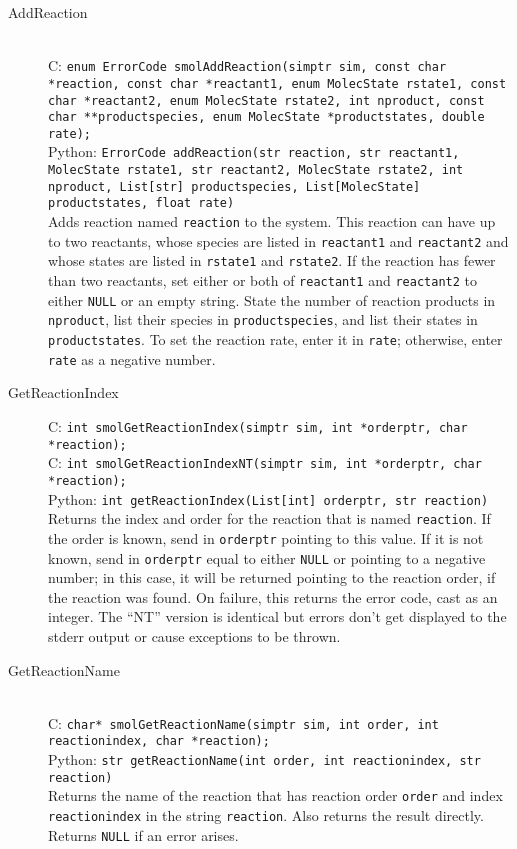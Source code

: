 \documentclass {book}
\begin{document}
\begin{description}

\item[AddReaction]
\hfill \\
C: \texttt{enum ErrorCode smolAddReaction(simptr sim, const char *reaction, const char *reactant1, enum MolecState rstate1, const char *reactant2, enum MolecState rstate2, int nproduct, const char **productspecies, enum MolecState *productstates, double rate);}\\
Python: \texttt{ErrorCode addReaction(str reaction, str reactant1, MolecState rstate1, str reactant2, MolecState rstate2, int nproduct, List[str] productspecies, List[MolecState] productstates, float rate)}\\
Adds reaction named \texttt{reaction} to the system. This reaction can have up to two reactants, whose species are listed in \texttt{reactant1} and \texttt{reactant2} and whose states are listed in \texttt{rstate1} and \texttt{rstate2}. If the reaction has fewer than two reactants, set either or both of \texttt{reactant1} and \texttt{reactant2} to either \texttt{NULL} or an empty string. State the number of reaction products in \texttt{nproduct}, list their species in \texttt{productspecies}, and list their states in \texttt{productstates}. To set the reaction rate, enter it in \texttt{rate}; otherwise, enter \texttt{rate} as a negative number.

\item[GetReactionIndex]
C: \texttt{int smolGetReactionIndex(simptr sim, int *orderptr, char *reaction);}\\
C: \texttt{int smolGetReactionIndexNT(simptr sim, int *orderptr, char *reaction);}\\
Python: \texttt{int getReactionIndex(List[int] orderptr, str reaction)}\\
Returns the index and order for the reaction that is named \texttt{reaction}. If the order is known, send in \texttt{orderptr} pointing to this value. If it is not known, send in \texttt{orderptr} equal to either \texttt{NULL} or pointing to a negative number; in this case, it will be returned pointing to the reaction order, if the reaction was found. On failure, this returns the error code, cast as an integer. The ``NT'' version is identical but errors don't get displayed to the stderr output or cause exceptions to be thrown.

\item[GetReactionName]
\hfill \\
C: \texttt{char* smolGetReactionName(simptr sim, int order, int reactionindex, char *reaction);}\\
Python: \texttt{str getReactionName(int order, int reactionindex, str reaction)}\\
Returns the name of the reaction that has reaction order \texttt{order} and index \texttt{reactionindex} in the string \texttt{reaction}. Also returns the result directly. Returns \texttt{NULL} if an error arises.


\end{description}
\end{document}
